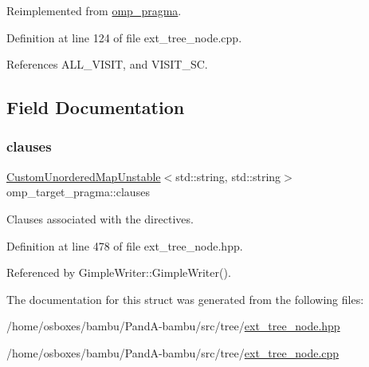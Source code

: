 Reimplemented from \hyperlink{structomp__pragma_a2e2c445528b7e097ae76fa618a9970b5}{omp\+\_\+pragma}.



Definition at line 124 of file ext\+\_\+tree\+\_\+node.\+cpp.



References A\+L\+L\+\_\+\+V\+I\+S\+IT, and V\+I\+S\+I\+T\+\_\+\+SC.



\subsection{Field Documentation}
\mbox{\label{structomp__target__pragma_ab4dde9a57e575ebebd813465695be1c1}} 
\subsubsection{\texorpdfstring{clauses}{clauses}}
{\footnotesize\ttfamily \hyperlink{custom__map_8hpp_a8cbaceffc09790a885ec7e9c17809c69}{Custom\+Unordered\+Map\+Unstable}$<$std\+::string, std\+::string$>$ omp\+\_\+target\+\_\+pragma\+::clauses}



Clauses associated with the directives. 



Definition at line 478 of file ext\+\_\+tree\+\_\+node.\+hpp.



Referenced by Gimple\+Writer\+::\+Gimple\+Writer().



The documentation for this struct was generated from the following files\+:\begin{DoxyCompactItemize}
\item 
/home/osboxes/bambu/\+Pand\+A-\/bambu/src/tree/\hyperlink{ext__tree__node_8hpp}{ext\+\_\+tree\+\_\+node.\+hpp}\item 
/home/osboxes/bambu/\+Pand\+A-\/bambu/src/tree/\hyperlink{ext__tree__node_8cpp}{ext\+\_\+tree\+\_\+node.\+cpp}\end{DoxyCompactItemize}
